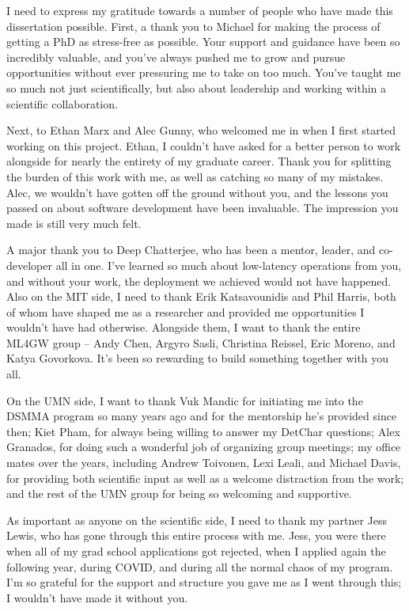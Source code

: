 
I need to express my gratitude towards a number of people who have made this dissertation possible.
First, a thank you to Michael for making the process of getting a PhD as stress-free as possible.
Your support and guidance have been so incredibly valuable, and you've always pushed me to grow and pursue opportunities without ever pressuring me to take on too much.
You've taught me so much not just scientifically, but also about leadership and working within a scientific collaboration.

Next, to Ethan Marx and Alec Gunny, who welcomed me in when I first started working on this project.
Ethan, I couldn't have asked for a better person to work alongside for nearly the entirety of my graduate career.
Thank you for splitting the burden of this work with me, as well as catching so many of my mistakes.
Alec, we wouldn't have gotten off the ground without you, and the lessons you passed on about software development have been invaluable.
The impression you made is still very much felt.

A major thank you to Deep Chatterjee, who has been a mentor, leader, and co-developer all in one.
I've learned so much about low-latency operations from you, and without your work, the deployment we achieved would not have happened.
Also on the MIT side, I need to thank Erik Katsavounidis and Phil Harris, both of whom have shaped me as a researcher and provided me opportunities I wouldn't have had otherwise.
Alongside them, I want to thank the entire ML4GW group -- Andy Chen, Argyro Sasli, Christina Reissel, Eric Moreno, and Katya Govorkova.
It's been so rewarding to build something together with you all.

On the UMN side, I want to thank Vuk Mandic for initiating me into the DSMMA program so many years ago and for the mentorship he's provided since then; Kiet Pham, for always being willing to answer my DetChar questions; Alex Granados, for doing such a wonderful job of organizing group meetings; my office mates over the years, including Andrew Toivonen, Lexi Leali, and Michael Davis, for providing both scientific input as well as a welcome distraction from the work; and the rest of the UMN group for being so welcoming and supportive.

As important as anyone on the scientific side, I need to thank my partner Jess Lewis, who has gone through this entire process with me.
Jess, you were there when all of my grad school applications got rejected, when I applied again the following year, during COVID, and during all the normal chaos of my program.
I'm so grateful for the support and structure you gave me as I went through this; I wouldn't have made it without you.

